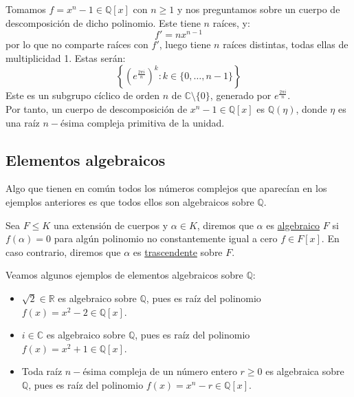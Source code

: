 \begin{ejemplo}
    Tomamos $f=x^n-1\in \mathbb{Q}[x]$ con $n\geq 1$ y nos preguntamos sobre un cuerpo de descomposición de dicho polinomio. Este tiene $n$ raíces, y:
    \begin{equation*}
        f' = nx^{n-1}
    \end{equation*}
    por lo que no comparte raíces con $f'$, luego tiene $n$ raíces distintas, todas ellas de multiplicidad 1. Estas serán:
    \begin{equation*}
        \left\{{\left(e^{\frac{2\pi i}{n}}\right)}^{k}:k\in \{0,\ldots,n-1\}\right\}
    \end{equation*}
    Este es un subgrupo cíclico de orden $n$ de $\mathbb{C}\setminus\{0\}$, generado por $e^{\frac{2\pi i}{n}}$.\\

    \noindent
    Por tanto, un cuerpo de descomposición de $x^n-1\in \mathbb{Q}[x]$ es $\mathbb{Q}(\eta)$, donde $\eta$ es una raíz $n-$ésima compleja primitiva de la unidad.
\end{ejemplo}

\subsection{Elementos algebraicos}
\noindent
Algo que tienen en común todos los números complejos que aparecían en los ejemplos anteriores es que todos ellos son algebraicos sobre $\mathbb{Q}$.

\begin{definicion}
    Sea $F\leq K$ una extensión de cuerpos y $\alpha\in K$, diremos que $\alpha$ es \underline{algebraico}  $F$ si $f(\alpha)=0$ para algún polinomio no constantemente igual a cero $f\in F[x]$. En caso contrario, diremos que $\alpha$ es \underline{trascendente} sobre $F$.
\end{definicion}

\begin{ejemplo}
    Veamos algunos ejemplos de elementos algebraicos sobre $\mathbb{Q}$:
    \begin{itemize}
        \item $\sqrt{2}\in \mathbb{R}$ es algebraico sobre $\mathbb{Q}$, pues es raíz del polinomio $f(x)=x^2-2\in \mathbb{Q}[x]$.
        \item $i\in \mathbb{C}$ es algebraico sobre $\mathbb{Q}$, pues es raíz del polinomio $f(x)=x^2+1\in \mathbb{Q}[x]$.
        \item Toda raíz $n-$ésima compleja de un número entero $r\geq 0$ es algebraica sobre $\mathbb{Q}$, pues es raíz del polinomio $f(x)=x^n-r\in \mathbb{Q}[x]$.
    \end{itemize}
\end{ejemplo}

